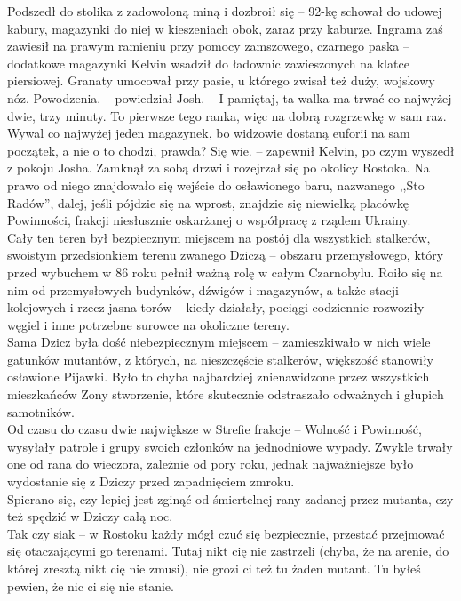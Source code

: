 \documentclass[../MAIN.tex]{subfiles}
\begin{document}
Podszedł do stolika z zadowoloną miną i dozbroił się -- 92-kę schował do udowej kabury, magazynki do niej w kieszeniach obok, zaraz przy kaburze. Ingrama zaś zawiesił na prawym ramieniu przy pomocy zamszowego, czarnego paska -- dodatkowe magazynki Kelvin wsadził do ładownic zawieszonych na klatce piersiowej. Granaty umocował przy pasie, u którego zwisał też duży, wojskowy nóz.
\sx Powodzenia. -- powiedział Josh. -- I pamiętaj, ta walka ma trwać co najwyżej dwie, trzy minuty. To pierwsze tego ranka, więc na dobrą rozgrzewkę w sam raz. Wywal co najwyżej jeden magazynek, bo widzowie dostaną euforii na sam początek, a nie o to chodzi, prawda?
\xx Się wie. -- zapewnił Kelvin, po czym wyszedł z pokoju Josha.
\qd
Zamknął za sobą drzwi i rozejrzał się po okolicy Rostoka. Na prawo od niego znajdowało się wejście do osławionego baru, nazwanego ,,Sto Radów'', dalej, jeśli pójdzie się na wprost, znajdzie się niewielką placówkę Powinności, frakcji niesłusznie oskarżanej o współpracę z rządem Ukrainy.\\
Cały ten teren był bezpiecznym miejscem na postój dla wszystkich stalkerów, swoistym przedsionkiem terenu zwanego Dziczą -- obszaru przemysłowego, który przed wybuchem w 86 roku pełnił ważną rolę w całym Czarnobylu. Roiło się na nim od przemysłowych budynków, dźwigów i magazynów, a także stacji kolejowych i rzecz jasna torów -- kiedy działały, pociągi codziennie rozwoziły węgiel i inne potrzebne surowce na okoliczne tereny.\\
Sama Dzicz była dość niebezpiecznym miejscem -- zamieszkiwało w nich wiele gatunków mutantów, z których, na nieszczęście stalkerów, większość stanowiły osławione Pijawki. Było to chyba najbardziej znienawidzone przez wszystkich mieszkańców Zony stworzenie, które skutecznie odstraszało odważnych i głupich samotników.\\
Od czasu do czasu dwie największe w Strefie frakcje -- Wolność i Powinność, wysyłały patrole i grupy swoich członków na jednodniowe wypady. Zwykle trwały one od rana do wieczora, zależnie od pory roku, jednak najważniejsze było wydostanie się z Dziczy przed zapadnięciem zmroku.\\
Spierano się, czy lepiej jest zginąć od śmiertelnej rany zadanej przez mutanta, czy też spędzić w Dziczy całą noc.\\
Tak czy siak -- w Rostoku każdy mógł czuć się bezpiecznie, przestać przejmować się otaczającymi go terenami. Tutaj nikt cię nie zastrzeli (chyba, że na arenie, do której zresztą nikt cię nie zmusi), nie grozi ci też tu żaden mutant. Tu byłeś pewien, że nic ci się nie stanie.\\
\end{document}
